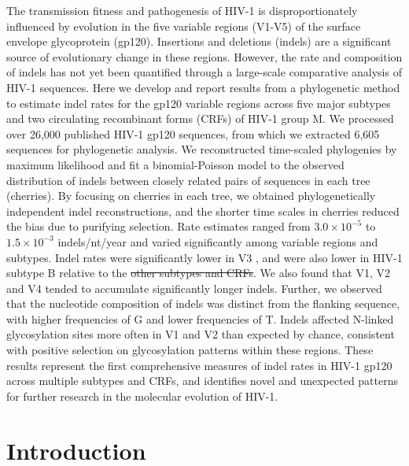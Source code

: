 \documentclass[12pt]{article}
\providecommand{\DIFadd}[1]{{\protect\color{blue}\uwave{#1}}} %
\providecommand{\DIFdel}[1]{{\protect\color{red}\sout{#1}}}                      %
\providecommand{\DIFaddbegin}{} %
\providecommand{\DIFaddend}{} %
\providecommand{\DIFdelbegin}{} %
\providecommand{\DIFdelend}{} %
\newcommand{\DIFscaledelfig}{0.5}
\newlength{\DIFdelgraphicswidth} %
\newlength{\DIFdelgraphicsheight} %
\newcommand{\DIFaddincludegraphics}[2][]{{\color{blue}\fbox{\DIFOincludegraphics[#1]{#2}}}} %
\newcommand{\DIFdelincludegraphics}[2][]{%
\sbox{\DIFdelgraphicsbox}{\DIFOincludegraphics[#1]{#2}}%
\settoboxwidth{\DIFdelgraphicswidth}{\DIFdelgraphicsbox} %
\settoboxtotalheight{\DIFdelgraphicsheight}{\DIFdelgraphicsbox} %
\scalebox{\DIFscaledelfig}{%
\parbox[b]{\DIFdelgraphicswidth}{\usebox{\DIFdelgraphicsbox}\\[-\baselineskip] \rule{\DIFdelgraphicswidth}{0em}}\llap{\resizebox{\DIFdelgraphicswidth}{\DIFdelgraphicsheight}{%
\setlength{\unitlength}{\DIFdelgraphicswidth}%
\begin{picture}(1,1)%
\thicklines\linethickness{2pt} %
{\color[rgb]{1,0,0}\put(0,0){\framebox(1,1){}}}%
{\color[rgb]{1,0,0}\put(0,0){\line( 1,1){1}}}%
{\color[rgb]{1,0,0}\put(0,1){\line(1,-1){1}}}%
\end{picture}%
}\hspace*{3pt}}} %
} %
\DeclareRobustCommand{\DIFaddbegin}{\DIFOaddbegin \let\includegraphics\DIFaddincludegraphics} %
\DeclareRobustCommand{\DIFaddend}{\DIFOaddend \let\includegraphics\DIFOincludegraphics} %
\DeclareRobustCommand{\DIFdelbegin}{\DIFOdelbegin \let\includegraphics\DIFdelincludegraphics} %
\DeclareRobustCommand{\DIFdelend}{\DIFOaddend \let\includegraphics\DIFOincludegraphics} %
\begin{document}
The transmission fitness and pathogenesis of HIV-1 is disproportionately influenced by evolution in the five variable regions (V1-V5) of the surface envelope glycoprotein (gp120).
Insertions and deletions (indels) are a significant source of evolutionary change in these regions.
However, the rate and composition of indels has not yet been quantified through a large-scale comparative analysis of HIV-1 sequences.
Here we develop and report results from a phylogenetic method to estimate indel rates for the gp120 variable regions across five major subtypes and two circulating recombinant forms (CRFs) of HIV-1 group M.
We processed over 26,000 published HIV-1 gp120 sequences, from which we extracted 6,605 sequences for phylogenetic analysis.
We reconstructed time-scaled phylogenies by maximum likelihood and fit a binomial-Poisson model to the observed distribution of indels between closely related pairs of sequences in each tree (cherries).
By focusing on cherries in each tree, we obtained phylogenetically independent indel reconstructions, and the shorter time scales in cherries reduced the bias due to purifying selection.
Rate estimates ranged from $3.0\times 10^{-5}$ to $1.5 \times 10^{-3}$ indels/nt/year and varied significantly among variable regions and subtypes.
Indel rates were significantly lower in V3 \DIFaddbegin \DIFadd{relative to V1}\DIFaddend , and were also lower in HIV-1 subtype B relative to the \DIFdelbegin \DIFdel{other subtypes and CRFs}\DIFdelend \DIFaddbegin \DIFadd{01\_AE reference}\DIFaddend .
We also found that V1, V2 and V4 tended to accumulate significantly longer indels.
Further, we observed that the nucleotide composition of indels was distinct from the flanking sequence, with higher frequencies of G and lower frequencies of T.
Indels affected N-linked glycosylation sites more often in V1 and V2 than expected by chance, consistent with positive selection on glycosylation patterns within these regions.
These results represent the first comprehensive measures of indel rates in HIV-1 gp120 across multiple subtypes and CRFs, and identifies novel and unexpected patterns for further research in the molecular evolution of HIV-1.




\clearpage

\section * {Introduction}
\end{document}
